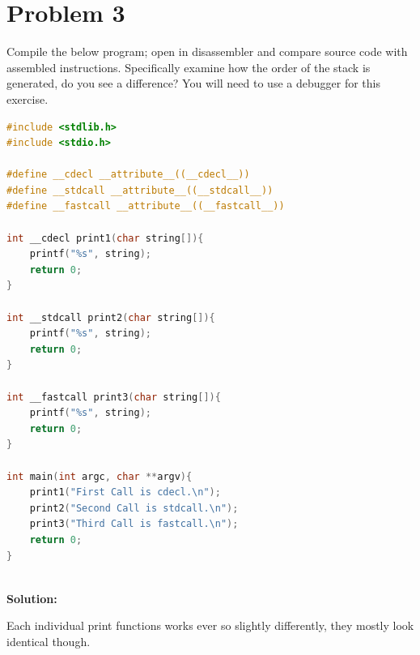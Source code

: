 \documentclass[12pt]{article}
\newcommand\tab[1][0.5cm]{\hspace*{#1}}
\begin{document}
\section{Problem 3}
\tab Compile the below program; open in disassembler and compare source code with assembled
instructions. Specifically examine how the order of the stack is generated, do you see a
difference? You will need to use a debugger for this exercise.
\begin{lstlisting}[language=C]
#include <stdlib.h>
#include <stdio.h>

#define __cdecl __attribute__((__cdecl__))
#define __stdcall __attribute__((__stdcall__))
#define __fastcall __attribute__((__fastcall__))

int __cdecl print1(char string[]){
	printf("%s", string);
	return 0;
}

int __stdcall print2(char string[]){
	printf("%s", string);
	return 0;
}

int __fastcall print3(char string[]){
	printf("%s", string);
	return 0;
}

int main(int argc, char **argv){
	print1("First Call is cdecl.\n");
	print2("Second Call is stdcall.\n");
	print3("Third Call is fastcall.\n");
	return 0;
}
\end{lstlisting}
\textbf{\\Solution:\\} 

Each individual print functions works ever so slightly differently, they mostly look identical though. 
\end{document}

